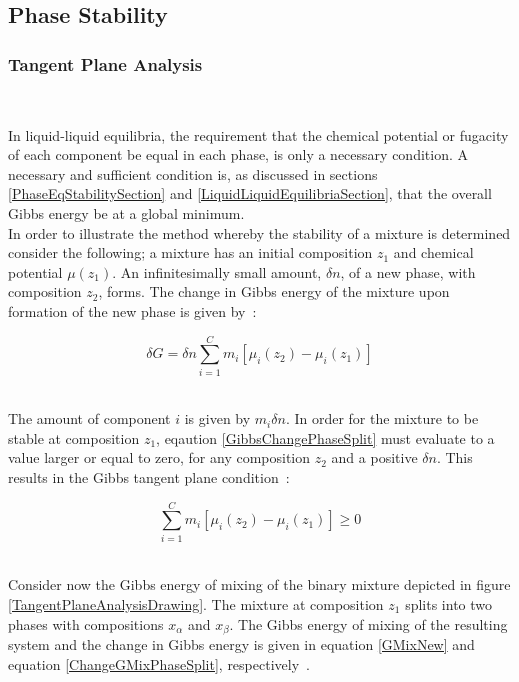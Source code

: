 
\subsection{Phase Stability}\label{PhaseStabilityComputationalSection}

\subsubsection{Tangent Plane Analysis}\label{TPDSection}\ 
	
In liquid-liquid equilibria, the requirement that the chemical potential or fugacity of each component be equal in each phase, is only a necessary condition. A necessary and sufficient condition is, as discussed in sections \ref{PhaseEqStabilitySection} and \ref{LiquidLiquidEquilibriaSection}, that the overall Gibbs energy be at a global minimum.\\

In order to illustrate the method whereby the stability of a mixture is determined consider the following; a mixture has an initial composition $z_{1}$  and chemical potential $\mu\left(z_{1}\right)$. An infinitesimally small amount, $\delta n$, of a new phase, with composition $z_{2}$,  forms. The change in Gibbs energy of the mixture upon formation of the new phase is given by~\cite{ThermodynamicModels}:\

\begin{equation}
\delta G = \delta n \sum_{i = 1}^{C} m_{i}\left[\mu_{i}\left(z_{2}\right) - \mu_{i}\left(z_{1}\right)\right] \label{GibbsChangePhaseSplit}
\end{equation}\

The amount of component $i$ is given by $m_{i} \delta n$. In order for the mixture to be stable at composition $z_{1}$, eqaution \ref{GibbsChangePhaseSplit} must evaluate to a value larger or equal to zero, for any composition $z_{2}$ and a positive $\delta n$. This results in the Gibbs tangent plane condition~\cite{ThermodynamicModels}:\

\begin{equation}
\sum_{i = 1}^{C} m_{i}\left[\mu_{i}\left(z_{2}\right) - \mu_{i}\left(z_{1}\right)\right] \geq 0 \label{GibbsTangentPlaneCondition}
\end{equation}\

Consider now the Gibbs energy of mixing of the binary mixture depicted in figure \ref{TangentPlaneAnalysisDrawing}. The mixture at composition $z_{1}$ splits into two phases with compositions $x_{\alpha}$ and $x_{\beta}$. The Gibbs energy of mixing of the resulting system and the change in Gibbs energy is given in equation \ref{GMixNew} and equation \ref{ChangeGMixPhaseSplit}, respectively~\cite{ThermodynamicModels, PhaseEquilCalcsEasyandHard}.\

